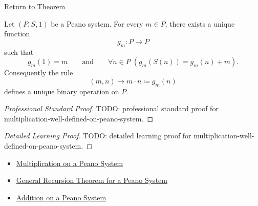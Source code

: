 \newpage
{}
\label{prf:multiplication-well-defined-on-peano-system}

\begin{remark*}[Return]
\hyperref[thm:multiplication-well-defined-on-peano-system]{Return to Theorem}
\end{remark*}

\begin{theorem*}
Let $(P,S,1)$ be a Peano system. For every $m \in P$, there exists a unique
function
\[
g_m : P \to P
\]
such that
\[
g_m(1)=m
\qquad\text{and}\qquad
\forall n \in P\;(g_m(S(n))=g_m(n)+m).
\]
Consequently the rule
\[
(m,n) \longmapsto m \cdot n \coloneqq g_m(n)
\]
defines a unique binary operation on $P$.
\end{theorem*}

\begin{proof}[Professional Standard Proof]
\LRAProofBodyStart
TODO: professional standard proof for multiplication-well-defined-on-peano-system.
\end{proof}

\begin{proof}[Detailed Learning Proof]
\LRAProofBodyStart
TODO: detailed learning proof for multiplication-well-defined-on-peano-system.
\end{proof}

\begin{remark*}
\end{remark*}

\begin{dependencies}
\begin{itemize}
  \item \hyperref[def:multiplication-on-peano-system]{Multiplication on a Peano System}
  \item \hyperref[thm:general-recursion-theorem-for-peano-system]{General Recursion Theorem for a Peano System}
  \item \hyperref[def:addition-on-peano-system]{Addition on a Peano System}
\end{itemize}
\end{dependencies}

\clearpage

